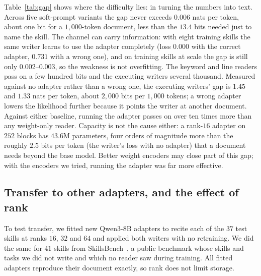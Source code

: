\documentclass[11pt]{article}
\begin{document}
Table~\ref{tab:gap} shows where the difficulty lies: in turning the numbers into text. Across five soft-prompt variants the gap never exceeds $0.006$ nats per token,
about one bit for a $1{,}000$-token document, less than the $13.4$ bits needed just to name the skill. The channel can carry information: with eight
training skills the same writer learns to use the adapter completely (loss $0.000$ with the correct adapter, $0.731$ with a wrong one), and on
training skills at scale the gap is still only $0.002$--$0.003$, so the weakness is not overfitting. The keyword and line readers pass on a few
hundred bits and the executing writers several thousand. Measured against no adapter rather than a wrong one, the executing writers'
gap is $1.45$ and $1.33$ nats per token, about $2{,}000$ bits per $1{,}000$ tokens; a wrong adapter lowers the likelihood further because it
points the writer at another document. Against either baseline, running the adapter passes on over ten times more than any weight-only reader. Capacity is not the cause either: a rank-$16$ adapter on
$252$ blocks has $43.6$M parameters, four orders of magnitude more than the roughly $2.5$ bits per token (the writer's loss with no adapter) that a document needs beyond the base model.
Better weight encoders may close part of this gap; with the encoders we tried, running the adapter was far more effective.

\subsection{Transfer to other adapters, and the effect of rank}
\label{sec:res-rank}

To test transfer, we fitted new Qwen3-8B adapters to recite each of the $37$ test skills at ranks $16$, $32$ and $64$ and applied both writers with no
retraining. We did the same for $41$ skills from SkillsBench~\cite{skillsbench}, a public benchmark whose skills and tasks we did not write and which no
reader saw during training. All fitted adapters reproduce their document exactly, so rank does not limit storage.
\end{document}
